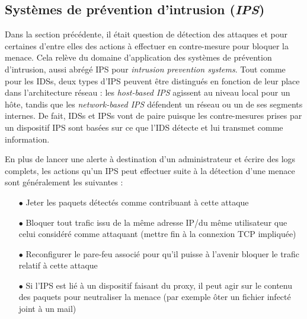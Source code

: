 \documentclass[]{article}
\begin{document}
\newpage
\subsection{Systèmes de prévention d'intrusion (\textit{IPS})}\label{IPS}
\par Dans la section précédente, il était question de détection des attaques et pour certaines d'entre elles des actions à effectuer en contre-mesure pour bloquer la menace. Cela relève du domaine d'application des systèmes de prévention d'intrusion, aussi abrégé IPS pour \textit{intrusion prevention systems}. Tout comme pour les IDSs, deux types d'IPS peuvent être distingués en fonction de leur place dans l'architecture réseau : les \textit{host-based IPS} agissent au niveau local pour un hôte, tandis que les \textit{network-based IPS} défendent un réseau ou un de ses segments internes. De fait, IDSs et IPSs vont de paire puisque les contre-mesures prises par un dispositif IPS sont basées sur ce que l'IDS détecte et lui transmet comme information.
\vspace{0.2cm}
\par En plus de lancer une alerte à destination d'un administrateur et écrire des logs complets,  les actions qu'un IPS peut effectuer suite à la détection d'une menace sont généralement les suivantes :
\vspace{0.2cm}
\begin{itemize}
\item[$\bullet$] Jeter les paquets détectés comme contribuant à cette attaque
\vspace{0.2cm}
\item[$\bullet$] Bloquer tout trafic issu de la même adresse IP/du même utilisateur que celui considéré comme attaquant (mettre fin à la connexion TCP impliquée)
\vspace{0.2cm}
\item[$\bullet$] Reconfigurer le pare-feu associé pour qu'il puisse à l'avenir bloquer le trafic relatif à cette attaque
\vspace{0.2cm}
\item[$\bullet$] Si l'IPS est lié à un dispositif faisant du proxy, il peut agir sur le contenu des paquets pour neutraliser la menace (par exemple ôter un fichier infecté joint à un mail)
\end{itemize}
\end{document}
